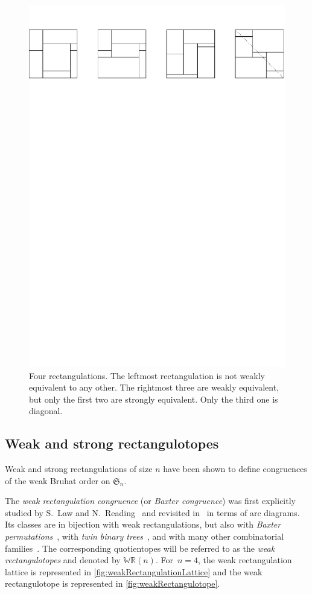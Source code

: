 \documentclass{amsart}
\theoremstyle{definition}
\newcommand{\f}[1]{\mathfrak{#1}} %
\newcommand{\darkblue}{\color{darkblue}} %
\newcommand{\defn}[1]{\textsl{\darkblue #1}} %
\newcommand{\polytope}[1]{\mathds{#1}} %
\newcommand{\WRP}{\polytope{WR}} %
\begin{document}
\begin{figure}
  \includegraphics[width=.9\textwidth]{rectangulations.pdf}
	\caption{Four rectangulations. The leftmost rectangulation is not weakly equivalent to any other. The rightmost three are weakly equivalent, but only the first two are strongly equivalent. Only the third one is diagonal.}
	\label{fig:rectequiv}
\end{figure}


\subsection{Weak and strong rectangulotopes}

Weak and strong rectangulations of size $n$ have been shown to define congruences of the weak Bruhat order on $\f{S}_n$.

The \defn{weak rectangulation congruence} (or \defn{Baxter congruence}) was first explicitly studied by S.~Law and N.~Reading~\cite{MR2871762} and revisited in~\cite[Thm.~1.1 \& Exm.~4.10]{Reading-arcDiagrams} in terms of arc diagrams.
Its classes are in bijection with weak rectangulations, but also with \defn{Baxter permutations}~\cite{MR0491652,MR0555815}, with \defn{twin binary trees}~\cite{MR1417289,MR2914637}, and with many other combinatorial families~\cite{MR2763051}. 
The corresponding quotientopes will be referred to as the \defn{weak rectangulotopes} and denoted by $\WRP(n)$.
For~$n = 4$, the weak rectangulation lattice is represented in \cref{fig:weakRectangulationLattice} and the weak rectangulotope is represented in \cref{fig:weakRectangulotope}.
\end{document}
